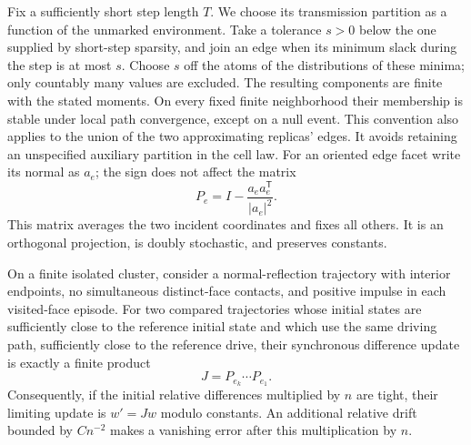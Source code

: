 Fix a sufficiently short step length $T$. We choose its transmission
partition as a function of the unmarked environment. Take a tolerance
$s>0$ below the one supplied by short-step sparsity, and join an edge
when its minimum slack during the step is at most $s$. Choose $s$ off
the atoms of the distributions of these minima; only countably many
values are excluded. The resulting components are finite with the stated
moments. On every fixed finite neighborhood their membership is stable
under local path convergence, except on a null event. This convention
also applies to the union of the two approximating replicas' edges.
It avoids retaining an unspecified auxiliary partition in the cell law.
For an oriented edge facet write
its normal as $a_e$; the sign does not affect the matrix
\[
 P_e=I-\frac{a_ea_e^{\mathsf T}}{|a_e|^2}.
\]
This matrix averages the two incident coordinates and fixes all others.
It is an orthogonal projection, is doubly stochastic, and preserves constants.

\begin{lemma}\label{b:tangent}
On a finite isolated cluster, consider a normal-reflection trajectory with
interior endpoints, no simultaneous distinct-face contacts, and positive
impulse in each visited-face episode. For two compared trajectories whose
initial states are sufficiently close to the reference initial state and
which use the same driving path, sufficiently close to the reference drive,
their synchronous difference update is exactly a finite product
\[
 J=P_{e_k}\cdots P_{e_1}.
\]
Consequently, if the initial relative differences multiplied by $n$ are
tight, their limiting update is $w'=Jw$ modulo constants. An additional
relative drift bounded by $Cn^{-2}$ makes a vanishing error after this
multiplication by $n$.
\end{lemma}

